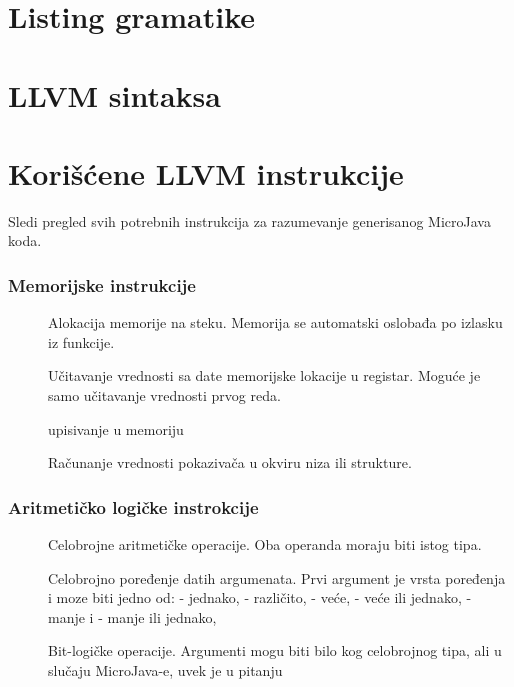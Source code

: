 
\appendix

\chapter{Listing gramatike}
\lstset{
  basicstyle=\footnotesize
}



\chapter{LLVM sintaksa}



\chapter{Korišćene LLVM instrukcije}

Sledi pregled svih potrebnih instrukcija za razumevanje generisanog MicroJava koda.

\subsection*{Memorijske instrukcije}

\begin{description}
\item[] Alokacija memorije na steku. Memorija se automatski oslobađa po izlasku iz funkcije.
\item[] Učitavanje vrednosti sa date memorijske lokacije u registar. Moguće je samo učitavanje vrednosti prvog reda.
\item[] upisivanje u memoriju
\item[] Računanje vrednosti pokazivača u okviru niza ili strukture.
\end{description}

\subsection*{Aritmetičko logičke instrokcije}

\begin{description}
\item[] Celobrojne aritmetičke operacije. Oba operanda moraju biti istog tipa.
\item[] Celobrojno poređenje datih argumenata. Prvi argument je vrsta poređenja i moze biti
jedno od:  - jednako,   - različito,  - veće,  - veće ili jednako,   - manje i   - manje ili jednako, 
\item[] Bit-logičke operacije. Argumenti mogu biti bilo kog celobrojnog tipa, ali u slučaju MicroJava-e, uvek je u pitanju 
\end{description}

